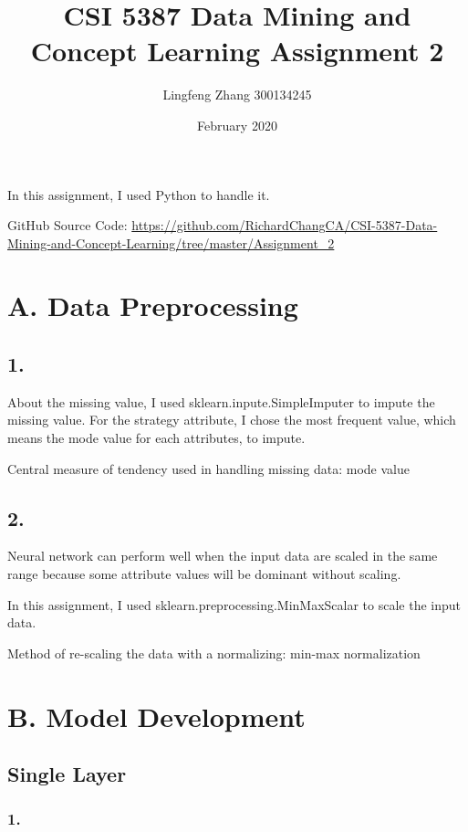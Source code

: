 \documentclass{article}
\title{CSI 5387 Data Mining and Concept Learning Assignment 2}
\author{Lingfeng Zhang 300134245}
\date{February 2020}
\begin{document}
\maketitle

In this assignment, I used Python to handle it.

GitHub Source Code: \href{https://github.com/RichardChangCA/CSI-5387-Data-Mining-and-Concept-Learning/tree/master/Assignment_2}{https://github.com/RichardChangCA/CSI-5387-Data-Mining-and-Concept-Learning/tree/master/Assignment\_2}

\section{A. Data Preprocessing}

\subsection{1.}

About the missing value, I used sklearn.inpute.SimpleImputer to impute the missing value. For the strategy attribute, I chose the most frequent value, which means the mode value for each attributes, to impute.

Central measure of tendency used in handling missing data: mode value

\subsection{2.}

Neural network can perform well when the input data are scaled in the same range because some attribute values will be dominant without scaling.

In this assignment, I used sklearn.preprocessing.MinMaxScalar to scale the input data.

Method of re-scaling the data with a normalizing: min-max normalization

\section{B. Model Development}

\subsection{Single Layer}

\subsubsection{1.}
\end{document}
